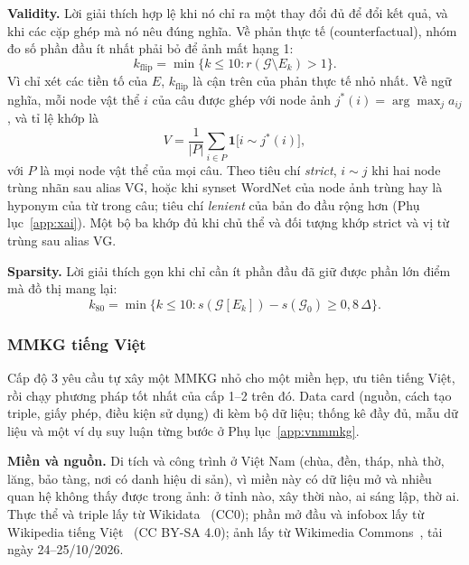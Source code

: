 \textbf{Validity.} Lời giải thích hợp lệ khi nó chỉ ra một thay đổi đủ để đổi kết quả, và khi các cặp ghép mà nó nêu đúng
nghĩa. Về phản thực tế (counterfactual), nhóm đo số phần đầu ít nhất phải bỏ để ảnh mất hạng 1:
\begin{equation}
  k_{\text{flip}}=\min\{k\le 10: r(\mathcal{G}\setminus E_k)>1\}.
  \label{eq:kflip}
\end{equation}
Vì chỉ xét các tiền tố của $E$, $k_{\text{flip}}$ là cận trên của phản thực tế nhỏ nhất. Về ngữ nghĩa, mỗi node vật thể $i$
của câu được ghép với node ảnh $j^{*}(i)=\arg\max_j a_{ij}$, và tỉ lệ khớp là
\begin{equation}
  V=\frac{1}{|P|}\sum_{i\in P}\mathbf{1}\bigl[i\sim j^{*}(i)\bigr],
  \label{eq:validity}
\end{equation}
với $P$ là mọi node vật thể của mọi câu. Theo tiêu chí \emph{strict}, $i\sim j$ khi hai node trùng nhãn sau alias VG, hoặc
khi synset WordNet của node ảnh trùng hay là hyponym của từ trong câu; tiêu chí \emph{lenient} của bản đo đầu rộng hơn
(Phụ lục~\ref{app:xai}). Một bộ ba khớp đủ khi chủ thể và đối tượng khớp strict và vị từ trùng sau alias VG.

\textbf{Sparsity.} Lời giải thích gọn khi chỉ cần ít phần đầu đã giữ được phần lớn điểm mà đồ thị mang lại:
\begin{equation}
  k_{80}=\min\{k\le 10: s(\mathcal{G}[E_k])-s(\mathcal{G}_0)\ge0{,}8\,\Delta\}.
  \label{eq:k80}
\end{equation}

\subsubsection{MMKG tiếng Việt}\label{sec:vn-data}
Cấp độ 3 yêu cầu tự xây một MMKG nhỏ cho một miền hẹp, ưu tiên tiếng Việt, rồi chạy phương pháp tốt nhất của cấp 1--2 trên
đó. Data card (nguồn, cách tạo triple, giấy phép, điều kiện sử dụng) đi kèm bộ dữ liệu; thống kê đầy đủ, mẫu dữ liệu và một ví dụ suy luận từng bước ở Phụ lục~\ref{app:vnmmkg}.

\textbf{Miền và nguồn.} Di tích và công trình ở Việt Nam (chùa, đền, tháp, nhà thờ, lăng, bảo tàng, nơi có danh hiệu di
sản), vì miền này có dữ liệu mở và nhiều quan hệ không thấy được trong ảnh: ở tỉnh nào, xây thời nào, ai sáng lập, thờ ai.
Thực thể và triple lấy từ Wikidata~\cite{vrandecic2014wikidata} (CC0); phần mở đầu và infobox lấy từ Wikipedia tiếng
Việt~\cite{vn-viwiki} (CC BY-SA 4.0); ảnh lấy từ Wikimedia Commons~\cite{vn-commons}, tải ngày 24--25/10/2026.

